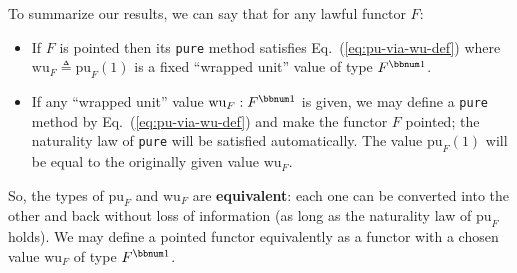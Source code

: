 To summarize our results, we can say that for any lawful functor $F$:
\begin{itemize}
\item If $F$ is pointed then its \lstinline!pure! method satisfies Eq.~(\ref{eq:pu-via-wu-def})
where $\text{wu}_{F}\triangleq\text{pu}_{F}(1)$ is a fixed \textsf{``}wrapped
unit\textsf{''} value of type $F^{\bbnum 1}$.
\item If any \textsf{``}wrapped unit\textsf{''} value $\text{wu}_{F}:F^{\bbnum 1}$ is given,
we may define a \lstinline!pure! method by Eq.~(\ref{eq:pu-via-wu-def})
and make the functor $F$ pointed; the naturality law of \lstinline!pure!
will be satisfied automatically. The value $\text{pu}_{F}(1)$ will
be equal to the originally given value $\text{wu}_{F}$.
\end{itemize}
So, the types of $\text{pu}_{F}$ and $\text{wu}_{F}$ are\textbf{
equivalent}: each one can be converted into
the other and back without loss of information (as long as the naturality
law of $\text{pu}_{F}$ holds). We may define a pointed functor equivalently
as a functor with a chosen value $\text{wu}_{F}$ of type $F^{\bbnum 1}$. 

